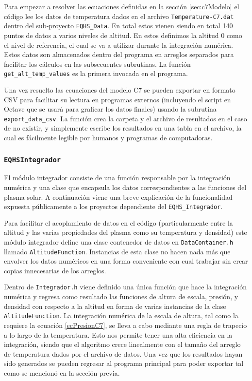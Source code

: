 Para empezar a resolver las ecuaciones definidas en la sección
\ref{sec:c7Modelo} el código lee los datos de temperatura dados en el archivo
\verb|Temperature-C7.dat| dentro del sub-proyecto \verb|EQHS_Data|. En total
estos vienen siendo en total 140 puntos de datos a varios niveles de altitud. En
estos definimos la altitud 0 como el nivel de referencia, el cual se va a
utilizar durante la integración numérica. Estos datos son almacenados dentro del
programa en arreglos separados para facilitar los cálculos en las subsecuentes
subrutinas. La función \verb|get_alt_temp_values| es la primera invocada en el
programa.

Una vez resuelto las ecuaciones del modelo C7 se pueden exportar en formato CSV
para facilitar su lectura en programas externos (incluyendo el script en Octave
que se usará para graficar los datos finales) usando la subrutina
\verb|export_data_csv|. La función crea la carpeta y el archivo de resultados en
el caso de no existir, y simplemente escribe los resultados en una tabla en el
archivo, la cual es fácilmente legible por humanos y programas de computadoras.

\subsubsection{\texttt{EQHS\textunderscore Integrador}} El módulo integrador
consiste de una función responsable por la integración numérica y una clase que
encapsula los datos correspondientes a las funciones del plasma solar. A
continuación viene una breve explicación de la funcionalidad expuesta
públicamente a los proyectos dependiente del \verb|EQHS_Integrador|.

Para facilitar el acoplamiento de datos en el código (particularmente entre la
altitud y las varias propiedades del plasma como su temperatura y densidad) este
módulo integrador define una clase contenedor de datos en \verb|DataContainer.h|
llamado \verb|AltitudeFunction|. Instancias de esta clase no hacen nada más que
envolver los datos numéricos en una forma conveniente con cual trabajar sin
crear copias innecesarias de los arreglos. 

Dentro de \verb|Integrador.h| viene definido una única función que hace la
integración numérica y regresa como resultado las funciones de altura de escala,
presión, y densidad con respecto a la altitud en forma de varias instancias de
la clase \verb|AltitudeFunction|. La integración numérica de la escala de
altura, tal como la requiere la ecuación \ref{ecPresionC7}, se lleva a cabo
mediante una regla de trapecio a lo largo de la temperatura. Esto nos permite
tener una alta eficiencia en la integración, siendo que el algoritmo crece
linealmente con el tamaño del arreglo de temperatura dados por el archivo de
datos. Una vez que los resultados hayan sido generados se pueden regresar al
programa principal para poder exportar tal como se mencionó en la sección
previa.

